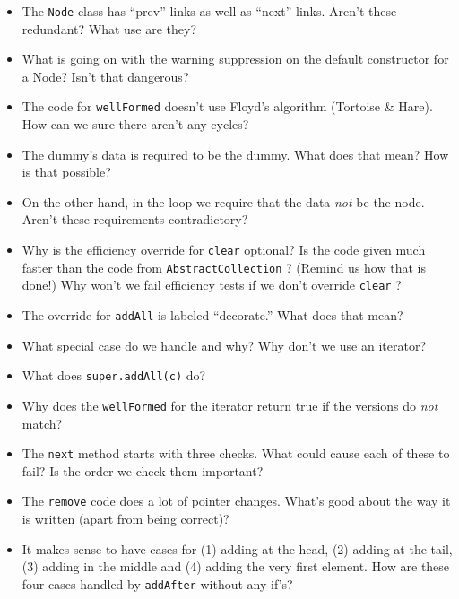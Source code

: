 \begin{itemize}
\item The \texttt{Node} class has ``prev'' links as well as ``next''
  links.  Aren't these redundant?  What use are they?
\item What is going on with the warning suppression on the default
  constructor for a Node?  Isn't that dangerous?
\item The code for \texttt{wellFormed} doesn't use Floyd's algorithm
  (Tortoise \& Hare).  How can we sure there aren't any cycles?
\item The dummy's data is required to be the dummy.  What does that
  mean?  How is that possible?
\item On the other hand, in the loop we require that the data
  \emph{not} be the node.  Aren't these requirements contradictory?
\item Why is the efficiency override for \texttt{clear} optional?
  Is the code given much faster than the code from
  \texttt{AbstractCollection} ? (Remind us how that is done!)
  Why won't we fail efficiency tests if we don't override
  \texttt{clear} ?
\item The override for \texttt{addAll} is labeled ``decorate.''  What
  does that mean?
\item What special case do we handle and why?  Why don't we use an iterator?
\item What does \texttt{super.addAll(c)} do?
\item Why does the \texttt{wellFormed} for the iterator return true if
  the versions do \emph{not} match?
\item The \texttt{next} method starts with three checks.  What could
  cause each of these to fail?  Is the order we check them important?
\item The \texttt{remove} code does a lot of pointer changes.  What's
  good about the way it is written (apart from being correct)?
\item It makes sense to have cases for (1) adding at the head, (2)
  adding at the tail, (3) adding in the middle and (4) adding the very
  first element.  How are these four cases handled  by
  \texttt{addAfter} without any if's?
\end{itemize}

